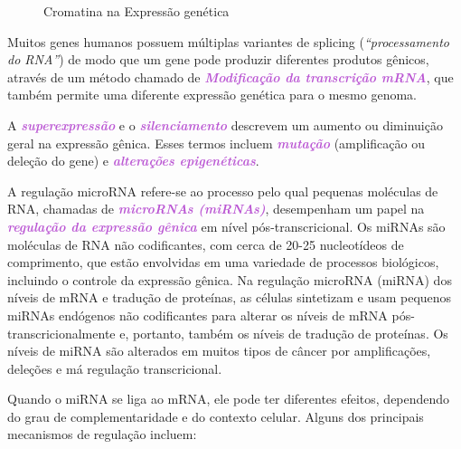 \documentclass[11pt,a4paper]{article}
\begin{document}
		\begin{figure}[h]
			\centering
			\caption{Cromatina na Expressão genética}
			\label{fig:cromatinaExpressaoGenetiva}
		\end{figure}

	Muitos genes humanos possuem múltiplas variantes de splicing (\textit{``processamento do RNA''}) de modo que um gene pode produzir diferentes produtos gênicos, através de um método chamado de \textcolor{MediumOrchid}{\textbf{\textit{Modificação da transcrição mRNA}}}, que também permite uma diferente expressão genética para o mesmo genoma.

	A \textcolor{MediumOrchid}{\textbf{\textit{superexpressão}}} e o \textcolor{MediumOrchid}{\textbf{\textit{silenciamento}}} descrevem um aumento ou diminuição geral na expressão gênica. Esses termos incluem \textcolor{MediumOrchid}{\textbf{\textit{mutação}}} (amplificação ou deleção do gene) e \textcolor{MediumOrchid}{\textbf{\textit{alterações epigenéticas}}}.

	A regulação microRNA refere-se ao processo pelo qual pequenas moléculas de RNA, chamadas de \textcolor{MediumOrchid}{\textbf{\textit{microRNAs (miRNAs)}}}, desempenham um papel na \textcolor{MediumOrchid}{\textbf{\textit{regulação da expressão gênica}}} em nível pós-transcricional. Os miRNAs são moléculas de RNA não codificantes, com cerca de 20-25 nucleotídeos de comprimento, que estão envolvidas em uma variedade de processos biológicos, incluindo o controle da expressão gênica. Na regulação microRNA (miRNA) dos níveis de mRNA e tradução de proteínas, as células sintetizam e usam pequenos miRNAs endógenos não codificantes para alterar os níveis de mRNA pós-transcricionalmente e, portanto, também os níveis de tradução de proteínas. Os níveis de miRNA são alterados em muitos tipos de câncer por amplificações, deleções e má regulação transcricional.

	Quando o miRNA se liga ao mRNA, ele pode ter diferentes efeitos, dependendo do grau de complementaridade e do contexto celular. Alguns dos principais mecanismos de regulação incluem:
\end{document}
